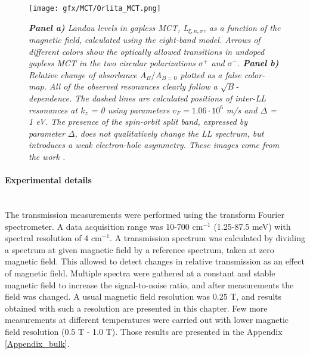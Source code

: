 \documentclass[titlepage,a4paper]{book}
\newcommand{\wciecie}{\quad\phantom{v}}
\newcommand{\myparagraph}[1]{\paragraph{#1}\mbox{}\\}
\begin{document}
\begin{figure}[ht]
	\centering
	\texttt{[image: gfx/MCT/Orlita\_MCT.png]}
	\vspace{-10pt}
	\caption{\textit{\textbf{Panel a)} Landau levels in gapless MCT, L$_{\xi,n,\sigma}$, as a function of the magnetic field, calculated using the eight-band model. Arrows of different colors show the optically allowed transitions in undoped gapless MCT in the two circular polarizations $\sigma^{+}$ and $\sigma^{-}$. \textbf{Panel b)} Relative change of absorbance $A_B/A_{B=0}$ plotted as a false color-map. All of the observed resonances clearly follow a $\sqrt{B}$-dependence. The dashed lines are calculated positions of inter-LL resonances at $k_z$ = 0 using parameters $v_F = 1.06 \cdot 10^6$ m/s and $\Delta$ = 1 eV. The presence of the spin-orbit split band, expressed by parameter $\Delta$, does not qualitatively change the LL spectrum, but introduces a weak electron-hole asymmetry. These images come from the work \cite{Orlita_MCT}.}}
	\label{fig:Orlita_MCT}
\end{figure}




\myparagraph{Experimental details}
\wciecie
The transmission measurements were performed using the transform Fourier spectrometer. A data acquisition range was 10-700 cm$^{-1}$ (1.25-87.5 meV) with spectral resolution of 4 cm$^{-1}$. A transmission spectrum was calculated by dividing a spectrum at given magnetic field by a reference spectrum, taken at zero magnetic field. This allowed to detect changes in relative transmission as an effect of magnetic field. Multiple spectra were gathered at a constant and stable magnetic field to increase the signal-to-noise ratio, and after measurements the field was changed. A usual magnetic field resolution was 0.25 T, and results obtained with such a resolution are presented in this chapter. Few more measurements at different temperatures were carried out with lower magnetic field resolution (0.5 T - 1.0 T). Those results are presented in the Appendix \ref{Appendix_bulk}.
\end{document}
